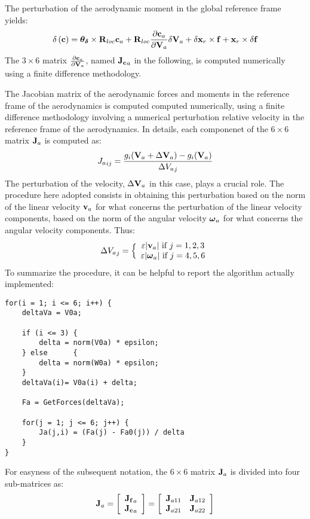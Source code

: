 The perturbation of the aerodynamic moment in the global reference frame
yields:
\begin{equation}
	\delta\plbr{\T{c}} = \T{\theta_{\delta}}\times\T{R}_{loc}\T{c}_a + 
				\T{R}_{loc}\frac{\partial\T{c}_a}{\partial\T{V}_a}
				\delta\T{V}_a + \delta \T{x}_r\times\T{f} + 
				\T{x}_r\times\delta\T{f}
\end{equation}
The $3\times6$ matrix $\frac{\partial\T{c}_a}{\partial\T{V}_a}$, 
named $\T{J_c}_a$ in the
following, is computed numerically using a finite difference methodology.

The Jacobian matrix of the aerodynamic forces and moments in the reference 
frame of the aerodynamics is computed computed numerically, using a finite 
difference methodology involving a numerical perturbation relative velocity
in the reference frame of the aerodynamics. In details, each componenet
of the $6\times6$ matrix $\T{J}_a$ is computed as:
\begin{equation}
	{J_a}_{ij} = \frac{g_i(\T{V}_a + \Delta\T{V}_a) 
		- g_i(\T{V}_a)}{\Delta {V_a}_j}
\end{equation}
The perturbation of the velocity, $\Delta\T{V}_a$ in this case, plays
a crucial role. The procedure here adopted consists in obtaining this
perturbation based on the norm of the linear velocity $\T{v}_a$ for what 
concerns the perturbation of the linear velocity components, based on
the norm of the angular velocity $\T{\omega}_a$ for what concerns 
the angular velocity components. Thus:
\begin{equation}
	\Delta {V_a}_j = \Bigl\{\matr{c}{
		\varepsilon\lvert\T{v}_a\lvert\text{ if $j = 1,2,3$}\\
		\varepsilon\lvert\T{\omega}_a\lvert\text{ if $j = 4,5,6$}
		}
\end{equation}
To summarize the procedure, it can be helpful to report the algorithm
actually implemented:
\begin{verbatim}
for(i = 1; i <= 6; i++)	{
    deltaVa = V0a; 
				
    if (i <= 3)	{
        delta = norm(V0a) * epsilon;
    } else		{
        delta = norm(W0a) * epsilon;
    }
    deltaVa(i)= V0a(i) + delta;
					
    Fa = GetForces(deltaVa);
	
    for(j = 1; j <= 6; j++)	{
        Ja(j,i) = (Fa(j) - Fa0(j)) / delta 
    }
}
\end{verbatim}

For easyness of the subsequent notation, the $6\times6$ matrix $\T{J}_a$ is 
divided into four sub-matrices as:
\begin{equation}
	\T{J}_a = \sqbr{\matr{c}{\T{J_f}_a\\\T{J_c}_a}}
	=\sqbr{\matr{cc}{\T{J}_{a11} & \T{J}_{a12}\\ \T{J}_{a21} & \T{J}_{a22}}}
\end{equation}


